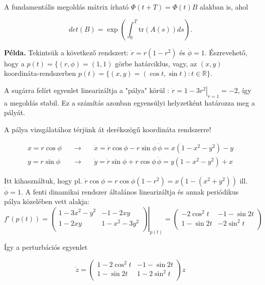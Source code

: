 A fundamentális megoldás mátrix írható $\Phi(t+T)=\Phi(t) B$ alakban is, ahol 

\begin{equation}
det(B)=\exp \left( \int_0^T \mathrm{tr}(A(s)) ds\right).
\end{equation}

\textbf{Példa.} Tekintsük a következő rendszert: $\dot{r}=r (1-r^2)$ és $\dot{\phi} = 1$. Észrevehető, hogy a $p(t) = \{(r,\phi)=(1,1)$ görbe határciklus, vagy, az $(x,y)$ koordináta-rendszerben $p(t) = \{(x,y)=(\cos t,\sin t):t\in\mathbb{R}\}$.

A sugárra felírt egyenlet linearizáltja a "pálya" körül : $\dot{r}=\left.1-3r^2\right|_{r=1}=-2$, így a megoldás stabil. Ez a számítás azonban egyensúlyi helyzetként határozza meg a pályát.

A pálya vizsgálatához térjünk át derékszögű koordináta rendszerre!

\begin{align}
x=r\cos \phi& \quad \rightarrow \quad & \dot{x}=\dot{r} \cos \phi-r \sin\phi\, \dot{\phi}=x\left(1-x^2-y^2\right)-y\\
y=r\sin \phi& \quad \rightarrow \quad & \dot{y}=\dot{r} \sin \phi+r \cos\phi\, \dot{\phi}=y\left(1-x^2-y^2\right)+x
\end{align}

Itt kihasználtuk, hogy pl. $\dot{r}\cos \phi=r\cos\phi(1-r^2)=x(1-(x^2+y^2))$ ill. $\dot{\phi}=1$. A fenti dinamikai rendszer  általános linearizáltja és annak periódikus pálya közelében vett alakja:
\begin{equation}
f'(p(t)) = \left. \begin{pmatrix}
1-3x^2-y^2 & -1-2xy \\
1-2xy & 1-x^2-3y^2 \\
\end{pmatrix} \right|_{p(t)}=
\begin{pmatrix}
-2\cos^2t & -1-\sin 2t \\
1-\sin 2t & -2\sin^2t \\
\end{pmatrix}
\end{equation}

Így a perturbációs egyenlet

\begin{equation}
\dot{z}=\begin{pmatrix}
1-2\cos^2t & -1-\sin 2t \\
1-\sin 2t & 1-2\sin^2t \\
\end{pmatrix} z
\end{equation}


